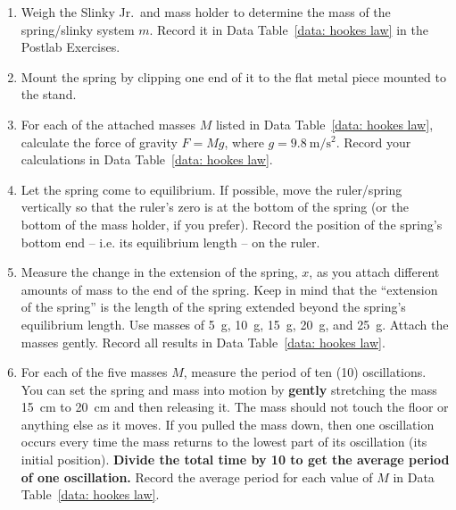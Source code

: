 \documentclass[addpoints]{physlabs}
\begin{document}
\begin{labsection}
\begin{experiment}
\begin{enumerate}
    \item Weigh the Slinky Jr.\texttrademark\ and mass holder to determine the mass of the spring/slinky system $m$. Record it in Data Table~\ref{data: hookes law} in the Postlab Exercises.
    \item Mount the spring by clipping one end of it to the flat metal piece mounted to the stand.
    \item For each of the attached masses $M$ listed in Data Table~\ref{data: hookes law}, calculate the force of gravity $F=Mg$, where $g=\qty{9.8}{\meter/\second^2}$. Record your calculations in Data Table~\ref{data: hookes law}.
    \item Let the spring come to equilibrium. If possible, move the ruler/spring vertically so that the ruler's zero is at the bottom of the spring (or the bottom of the mass holder, if you prefer). Record the position of the spring’s bottom end -- i.e. its equilibrium length -- on the ruler.
    \item Measure the change in the extension of the spring, $x$, as you attach different amounts of mass to the end of the spring. Keep in mind that the ``extension of the spring'' is the length of the spring extended beyond the spring's equilibrium length. Use masses of \qty{5}{\gram}, \qty{10}{\gram}, \qty{15}{\gram}, \qty{20}{\gram}, and \qty{25}{\gram}. Attach the masses gently. Record all results in Data Table~\ref{data: hookes law}.
    \item For each of the five masses $M$, measure the period of ten (10) oscillations. You can set the spring and mass into motion by {\bf gently} stretching the mass \qty{15}{\centi\meter} to \qty{20}{\centi\meter} and then releasing it. The mass should not touch the floor or anything else as it moves. If you pulled the mass down, then one oscillation occurs every time the mass returns to the lowest part of its oscillation (its initial position). {\bf Divide the total time by 10 to get the average period of one oscillation.} Record the average period for each value of $M$ in Data Table~\ref{data: hookes law}.
\end{enumerate}

\end{experiment}

\end{labsection}
\end{document}

